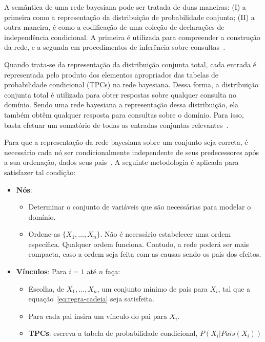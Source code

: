 A semântica de uma rede bayesiana pode ser tratada de duas maneiras: (I) a primeira como a representação da distribuição de probabilidade conjunta; (II) a outra maneira, é como a codificação de uma coleção de declarações de independência condicional. A primeira é utilizada para compreender a construção da rede, e a segunda em procedimentos de inferência sobre consultas~\cite{russell:2002}.

Quando trata-se da representação da distribuição conjunta total, cada entrada é representada pelo produto dos elementos apropriados das tabelas de probabilidade condicional (TPCs) na rede bayesiana. Dessa forma, a distribuição conjunta total é utilizada para obter respostas sobre qualquer consulta no domínio. Sendo uma rede bayesiana a representação dessa distribuição, ela também obtêm qualquer resposta para consultas sobre o domínio. Para isso, basta efetuar um somatório de todas as entradas conjuntas relevantes~\cite{russell:2002}.

Para que a representação da rede bayesiana sobre um conjunto seja correta, é necessário cada nó ser condicionalmente independente de seus predecessores após a sua ordenação, dados seus pais~\cite{russell:2002}. A seguinte metodologia é aplicada para satisfazer tal condição:

\begin{itemize}
    \item \textbf{Nós}:
    \begin{itemize}
        \item Determinar o conjunto de variáveis que são necessárias para modelar o domínio.
        \item Ordene-as $\{ X_1, \dots, X_n\}$. Não é necessário estabelecer uma ordem específica. Qualquer ordem funciona. Contudo, a rede poderá ser mais compacta, caso a ordem seja feita com as causas sendo os pais dos efeitos.
    \end{itemize}
    \item \textbf{Vínculos}: Para $i = 1$ até $n$ faça:
    \begin{itemize}
        \item Escolha, de $X_1, \dots, X_n$, um conjunto mínimo de pais para $X_i$, tal que a equação~\ref{eq:regra-cadeia} seja satisfeita.
        \item Para cada pai insira um vínculo do pai para $X_i$.
        \item \textbf{TPCs}: escreva a tabela de probabilidade condicional, $P(X_i|Pais(X_i))$
    \end{itemize}
\end{itemize}

